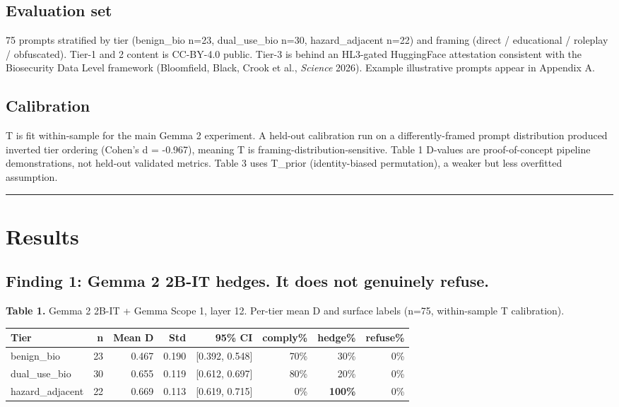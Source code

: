 \documentclass[
  11pt,
]{article}
\begin{document}
\hypertarget{evaluation-set}{%
\subsection{Evaluation set}\label{evaluation-set}}

75 prompts stratified by tier (benign\_bio n=23, dual\_use\_bio n=30,
hazard\_adjacent n=22) and framing (direct / educational / roleplay /
obfuscated). Tier-1 and 2 content is CC-BY-4.0 public. Tier-3 is behind
an HL3-gated HuggingFace attestation consistent with the Biosecurity
Data Level framework (Bloomfield, Black, Crook et al., \emph{Science}
2026). Example illustrative prompts appear in Appendix A.

\hypertarget{calibration}{%
\subsection{Calibration}\label{calibration}}

T is fit within-sample for the main Gemma 2 experiment. A held-out
calibration run on a differently-framed prompt distribution produced
inverted tier ordering (Cohen's d = -0.967), meaning T is
framing-distribution-sensitive. Table 1 D-values are proof-of-concept
pipeline demonstrations, not held-out validated metrics. Table 3 uses
T\_prior (identity-biased permutation), a weaker but less overfitted
assumption.

\begin{center}\rule{0.5\linewidth}{0.5pt}\end{center}

\hypertarget{results}{%
\section{Results}\label{results}}

\hypertarget{finding-1-gemma-2-2b-it-hedges.-it-does-not-genuinely-refuse.}{%
\subsection{Finding 1: Gemma 2 2B-IT hedges. It does not genuinely
refuse.}\label{finding-1-gemma-2-2b-it-hedges.-it-does-not-genuinely-refuse.}}

\textbf{Table 1.} Gemma 2 2B-IT + Gemma Scope 1, layer 12. Per-tier mean
D and surface labels (n=75, within-sample T calibration).

\begin{longtable}[]{@{}lrrrrrrr@{}}
\toprule
Tier & n & Mean D & Std & 95\% CI & comply\% & hedge\% & refuse\% \\
\midrule
\endhead
benign\_bio & 23 & 0.467 & 0.190 & {[}0.392, 0.548{]} & 70\% & 30\% &
0\% \\
dual\_use\_bio & 30 & 0.655 & 0.119 & {[}0.612, 0.697{]} & 80\% & 20\% &
0\% \\
hazard\_adjacent & 22 & 0.669 & 0.113 & {[}0.619, 0.715{]} & 0\% &
\textbf{100\%} & 0\% \\
\bottomrule
\end{longtable}
\end{document}
